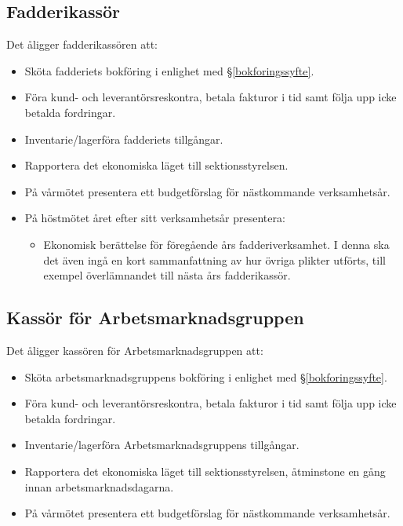 \documentclass{datateknologsektionen-document}
\begin{document}
\subsection{Fadderikassör}
\label{fadderikassor}
Det åligger fadderikassören att:
\begin{itemize}
  \item Sköta fadderiets bokföring i enlighet med \S \ref{bokforingssyfte}.
  \item Föra kund- och leverantörsreskontra, betala fakturor i tid samt följa upp icke betalda fordringar.
  \item Inventarie/lagerföra fadderiets tillgångar.
  \item Rapportera det ekonomiska läget till sektionsstyrelsen.
  \item På vårmötet presentera ett budgetförslag för nästkommande verksamhetsår.
  \item På höstmötet året efter sitt verksamhetsår presentera:
  \begin{itemize}
    \item Ekonomisk berättelse för föregående års fadderiverksamhet. I denna ska det även ingå
    en kort sammanfattning av hur övriga plikter utförts, till exempel överlämnandet till
    nästa års fadderikassör.
  \end{itemize}
\end{itemize}

\subsection{Kassör för Arbetsmarknadsgruppen}
\label{amgkassor}
Det åligger kassören för Arbetsmarknadsgruppen att:
\begin{itemize}
  \item Sköta arbetsmarknadsgruppens bokföring i enlighet med \S \ref{bokforingssyfte}.
  \item Föra kund- och leverantörsreskontra, betala fakturor i tid samt följa upp icke betalda fordringar.
  \item Inventarie/lagerföra Arbetsmarknadsgruppens tillgångar.
  \item Rapportera det ekonomiska läget till sektionsstyrelsen, åtminstone en gång innan arbetsmarknadsdagarna.
  \item På vårmötet presentera ett budgetförslag för nästkommande verksamhetsår.
\end{itemize}
\end{document}
